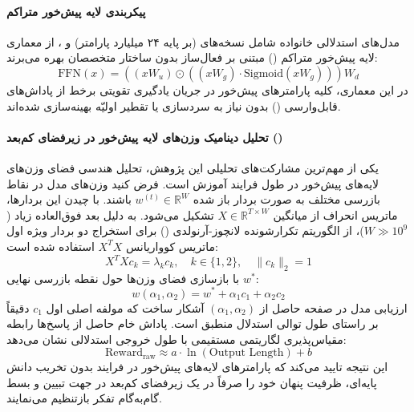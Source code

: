 \item {}

\paragraph*{پیکربندی لایه پیش‌خور متراکم}
مدل‌های استدلالی خانواده  \cite{mistralai2025magistral} شامل نسخه‌های  (بر پایه ۲۴ میلیارد پارامتر) و ، از معماری لایه پیش‌خور متراکم () مبتنی بر فعال‌ساز  بدون ساختار متخصصان بهره می‌برند:
\begin{equation}
    \text{FFN}(x) = \left( (x W_u) \odot \left( (x W_g) \cdot \text{Sigmoid}(x W_g) \right) \right) W_d
\end{equation}
در این معماری، کلیه پارامترهای پیش‌خور در جریان یادگیری تقویتی برخط از پاداش‌های قابل‌وارسی () بدون نیاز به سردسازی یا تقطیر اولیّه بهینه‌سازی شده‌اند.

\paragraph*{تحلیل دینامیک وزن‌های لایه پیش‌خور در زیرفضای کم‌بعد ()}
یکی از مهم‌ترین مشارکت‌های تحلیلی این پژوهش، تحلیل هندسی فضای وزن‌های لایه‌های پیش‌خور در طول فرایند آموزش  است. فرض کنید وزن‌های مدل در نقاط بازرسی مختلف به صورت بردار باز شده $w^{(t)} \in \mathbb{R}^W$ باشند. با چیدن این بردارها، ماتریس انحراف از میانگین $X \in \mathbb{R}^{T \times W}$ تشکیل می‌شود. به دلیل بعد فوق‌العاده زیاد ($W \gg 10^9$)، از الگوریتم تکرارشونده لانچوز-آرنولدی () \cite{saad2003iterative} برای استخراج دو بردار ویژه اول ماتریس کوواریانس $X^T X$ استفاده شده است:
\begin{equation}
    X^T X c_k = \lambda_k c_k, \quad k \in \{1, 2\}, \quad \|c_k\|_2 = 1
\end{equation}
با بازسازی فضای وزن‌ها حول نقطه بازرسی نهایی $w^*$:
\begin{equation}
    w(\alpha_1, \alpha_2) = w^* + \alpha_1 c_1 + \alpha_2 c_2
\end{equation}
ارزیابی مدل در صفحه حاصل از $(\alpha_1, \alpha_2)$ آشکار ساخت که مولفه اصلی اول $c_1$ دقیقاً بر راستای طول توالی استدلال منطبق است. پاداش خام حاصل از پاسخ‌ها رابطه مقیاس‌پذیری لگاریتمی مستقیمی با طول خروجی استدلالی نشان می‌دهد:
\begin{equation}
    \text{Reward}_{\text{raw}} \approx a \cdot \ln(\text{Output Length}) + b
\end{equation}
این نتیجه تایید می‌کند که پارامترهای لایه‌های پیش‌خور در فرایند  بدون تخریب دانش پایه‌ای، ظرفیت پنهان خود را صرفاً در یک زیرفضای کم‌بعد در جهت تبیین و بسط گام‌به‌گام تفکر بازتنظیم می‌نمایند.


